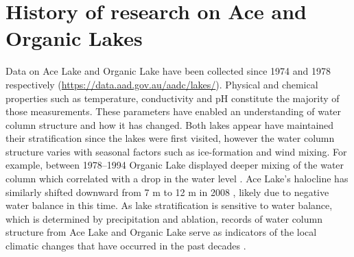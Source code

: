 \section{History of research on Ace and Organic Lakes}
Data on Ace Lake and Organic Lake have been collected since 1974 and 1978 respectively 
(\url{https://data.aad.gov.au/aadc/lakes/}).
Physical and chemical properties such as temperature, conductivity and pH constitute the majority of those measurements.
These parameters have enabled an understanding of water column structure and how it has changed.
Both lakes appear have maintained their stratification since the lakes were first visited, however the water column structure varies with seasonal factors such as ice-formation and wind mixing.
For example, between 1978--1994 Organic Lake displayed deeper mixing of the water column which correlated with a drop in the water level \cite{Gibson1995, Gibson1996}.
Ace Lake's halocline has similarly shifted downward from 7 m \cite{Rankin1999} to 12 m in 2008 \cite{Lauro2011}, likely due to negative water balance in this time.
As lake stratification is sensitive to water balance, which is determined by precipitation and ablation, records of water column structure from Ace Lake and Organic Lake serve as indicators of the local climatic changes that have occurred in the past decades \cite{Gibson1995}.


